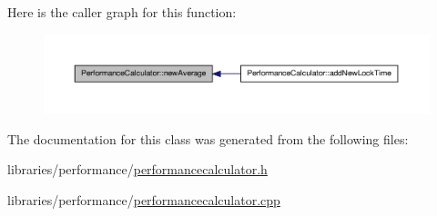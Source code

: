 Here is the caller graph for this function:\nopagebreak
\begin{figure}[H]
\begin{center}
\leavevmode
\includegraphics[width=400pt]{class_performance_calculator_ab6c79c61648b5f51aa4b391ba24053e7_icgraph}
\end{center}
\end{figure}




The documentation for this class was generated from the following files:\begin{DoxyCompactItemize}
\item 
libraries/performance/\hyperlink{performancecalculator_8h}{performancecalculator.h}\item 
libraries/performance/\hyperlink{performancecalculator_8cpp}{performancecalculator.cpp}\end{DoxyCompactItemize}
